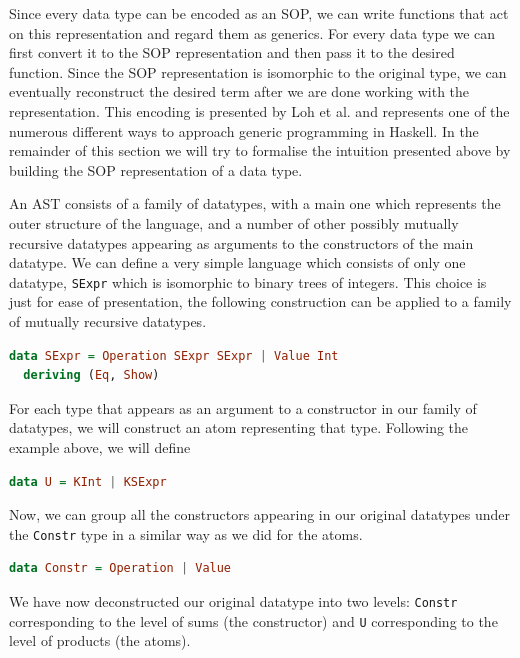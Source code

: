 \documentclass[11pt]{article}
\begin{document}
Since every data type can be encoded as an SOP, we can write functions 
that act on this representation and regard them as generics. For every data type 
we can first convert it to the SOP representation and then pass it to 
the desired function. Since the SOP representation is isomorphic to the original type, we can eventually reconstruct the 
desired term after we are done working with the representation. This encoding is 
presented by Loh et al. \cite{true-sop} and represents one of the numerous different ways to 
approach generic programming in Haskell. 
In the remainder of this section we will try to formalise the intuition presented 
above by building the SOP representation of a data type. 

\vfill

An AST consists of a family of datatypes, with a main one which
represents the outer structure of the language, and a number of other
possibly mutually recursive datatypes appearing as arguments to the
constructors of the main datatype. We can define a very simple language which 
consists of only one datatype, \texttt{SExpr} which is isomorphic to binary trees 
of integers. This choice is just for ease of presentation, the following construction 
can be applied to a family of mutually recursive datatypes.

\begin{lstlisting}[language=haskell]
data SExpr = Operation SExpr SExpr | Value Int
  deriving (Eq, Show)
\end{lstlisting}

For each type that appears as an argument to a constructor in our family
of datatypes, we will construct an atom representing that type.
Following the example above, we will define

\begin{lstlisting}[language=haskell]
data U = KInt | KSExpr 
\end{lstlisting}

Now, we can group all the constructors appearing in our original
datatypes under the \texttt{Constr} type in a similar way as we
did for the atoms. 

\begin{lstlisting}[language=haskell]
data Constr = Operation | Value
\end{lstlisting}

We have now deconstructed our original datatype into two levels: \texttt{Constr} corresponding to the level of sums (the constructor) 
and  \texttt{U} corresponding to the level of products (the atoms).
\end{document}
